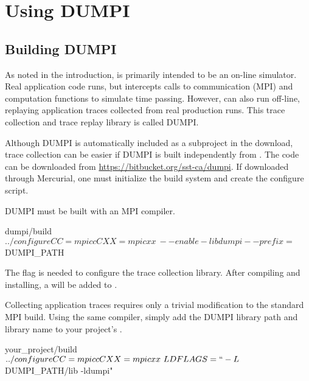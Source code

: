 
\section{Using DUMPI}
\label{sec:tutorial:dumpi}

\subsection{Building DUMPI}
\label{subset:dump:build}
As noted in the introduction, \sstmacro is primarily intended to be an on-line simulator. Real application code runs, but \sstmacro  intercepts calls to communication (MPI) and computation functions to simulate time passing.  However, \sstmacro can also run off-line, replaying application traces collected from real production runs.  This trace collection and trace replay library is called DUMPI.

Although DUMPI is automatically included as a subproject in the \sstmacro download, trace collection can be easier if DUMPI is built independently from \sstmacro.  The code can be downloaded from \url{https://bitbucket.org/sst-ca/dumpi}. If downloaded through Mercurial, one must initialize the build system and create the configure script.


DUMPI must be built with an MPI compiler.

\begin{ShellCmd}
dumpi/build$ ../configure CC=mpicc CXX=mpicxx \ 
	              --enable-libdumpi --prefix=$DUMPI_PATH
\end{ShellCmd}
The  flag is needed to configure the trace collection library.
After compiling and installing, a \inlineshell{libdumpi.\$prefix} will be added to .

Collecting application traces requires only a trivial modification to the standard MPI build.
Using the same compiler, simply add the DUMPI library path and library name to your project's .

\begin{ShellCmd}
your_project/build$ ../configure CC=mpicc CXX=mpicxx \
                                  LDFLAGS=``-L$DUMPI_PATH/lib -ldumpi"
\end{ShellCmd}

